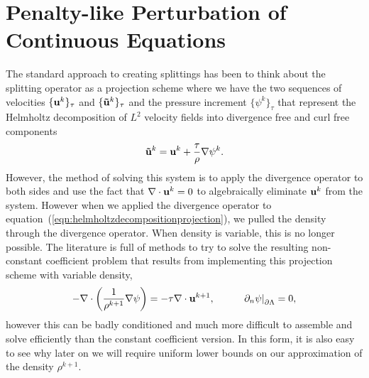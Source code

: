 \documentclass[letterpaper]{erdc}
\begin{document}
%
%
%
\section{Penalty-like Perturbation of Continuous Equations}
The standard approach to creating splittings has been to think about the splitting operator as a projection scheme where we have the two sequences of velocities $\{\textbf{u}^{k}\}_{\tau}$ and $\{\mathbf{\tilde{u}}^{k}\}_{\tau}$ and the pressure increment $\{\psi^{k}\}_{\tau}$ that represent the Helmholtz decomposition of $L^{2}$ velocity fields into divergence free and curl free components
\begin{equation}\label{eqn:helmholtzdecompositionprojection}
  \mathbf{\tilde{u}}^{k} = \textbf{u}^{k} + \frac{\tau}{\rho}\nabla \psi^{k}.
\end{equation}
 However, the method of solving this system is to apply the divergence operator to both sides and use the fact that $\nabla\cdot \textbf{u}^k = 0$ to algebraically eliminate $\textbf{u}^k$ from the system.  However when we applied the divergence operator to equation~(\ref{eqn:helmholtzdecompositionprojection}), we pulled the density through the divergence operator.   When density is variable, this is no longer possible.  The literature is full of methods to try to solve the resulting non-constant coefficient problem that results from implementing this projection scheme with variable density,
\begin{equation}
  -\nabla\cdot\left(\frac{1}{\rho^{k+1}} \nabla\psi \right) = -\tau\nabla\cdot \textbf{u}^{k+1},  \hspace{1cm} \left.\partial_n \psi\right|_{\partial\Lambda} = 0,
\end{equation}  
however this can be badly conditioned and much more difficult to assemble and solve efficiently than the constant coefficient version.  In this form, it is also easy to see why later on we will require uniform lower bounds on our approximation of the density $\rho^{k+1}$.
\end{document}
